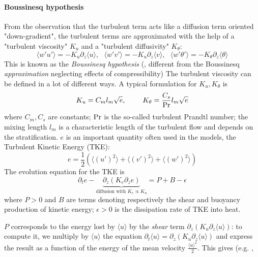 \paragraph{Boussinesq hypothesis}
From the observation that the turbulent term acts like a diffusion
term oriented "down-gradient", the turbulent terms are approximated
with the help of a "turbulent viscosity" $K_u$ and a
"turbulent diffusivity" $K_\theta$:
\begin{equation}
\langle w' u'\rangle = - K_u \partial_z \langle u \rangle, ~~~
\langle w' v'\rangle = - K_u \partial_z \langle v \rangle, ~~~
\langle w' \theta'\rangle =
	- K_\theta \partial_z \langle \theta \rangle
\end{equation}
This is known as the \textit{Boussinesq hypothesis}
(\citep{boussinesq_theorie_1897},
different from the Boussinesq \textit{approximation} neglecting
effects of compressibility)
The turbulent viscosity can be defined in a lot of different ways.
A typical formulation for $K_u, K_\theta$ is
\begin{equation}
	K_u = C_m l_m \sqrt{e}, ~~~~~~~ K_\theta = \frac{C_s}{\rm Pr}
	l_m \sqrt{e}
\end{equation}
where $C_m, C_s$ are constants; ${\rm Pr}$ is the so-called turbulent
Prandtl number; the mixing length $l_m$ is a characteristic
length of the turbulent flow and depends on the stratification.
$e$ is an important quantity often used in the models,
the Turbulent Kinetic Energy (TKE):
\begin{equation}
	e = \frac{1}{2} \left(\langle (u')^2 \rangle + \langle (v')^2 \rangle
	+ \langle (w')^2 \rangle\right)
\end{equation}
The evolution equation for the TKE is
\begin{equation}
	\partial_t e - 
\underbrace{\partial_z \left(K_e
    \partial_z e\right)}_{\text{diffusion with } K_e \propto K_u}
    = P + B - \epsilon
\end{equation}
where $P>0$ and $B$ are terms denoting respectively
the shear and buoyancy production of kinetic energy;
$\epsilon>0$ is the dissipation rate of TKE
into heat.
\par
$P$ corresponds to the energy lost by $\langle u \rangle$ by the
\textit{shear} term
$\partial_z \left(K_u \partial_z \langle u \rangle\right)$:
to compute it, we multiply by $\langle u \rangle$ the equation
$\partial_t \langle u \rangle = \partial_z (K_u \partial_z \langle u \rangle)$
and express the result as a function of the
energy of the mean velocity $\frac{\langle u \rangle^2}{2}$.
This gives (e.g. \citep{burchard_energy-conserving_2002},
